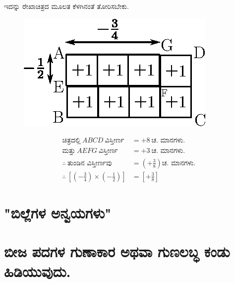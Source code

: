 ಇದನ್ನು ರೇಖಾಚಿತ್ರದ ಮೂಲತ ಕೆಳಗಿನಂತೆ ತೋರಿಸಬೇಕು. 
\begin{figure}[H]
\centering
\includegraphics[scale=0.8]{src/figure/chap3/fig3-28b.eps}
\end{figure}

\vspace{-.5cm}

\begin{align*}
\text{ಚಿತ್ರದಲ್ಲಿ}~ ABCD ~\text{ವಿಸ್ತೀರ್ಣ} & = +8~ \text{ಚ. ಮಾನಗಳು.}\\
\text{ಮತ್ತು}~ AEFG ~\text{ವಿಸ್ತೀರ್ಣ} & = +3~ \text{ಚ. ಮಾನಗಳು.}\\
\therefore~ \text{ತುಂಡಿನ ವಿಸ್ತೀರ್ಣವು} & = \left(+\frac{3}{8} \right) \text{ಚ. ಮಾನಗಳು.}\\
\therefore~ \left[\left(-\frac{3}{4}\right) \times \left(-\frac{1}{2}\right) \right] & = \left[+\frac{3}{8}\right]
\end{align*}

\newpage

\section{"ಬಿಲ್ಲೆಗಳ ಅನ್ವಯಗಳು"}\label{sec3.4}%

\section*{ಬೀಜ ಪದಗಳ ಗುಣಾಕಾರ ಅಥವಾ ಗುಣಲಬ್ಧ ಕಂಡು ಹಿಡಿಯುವುದು.}

